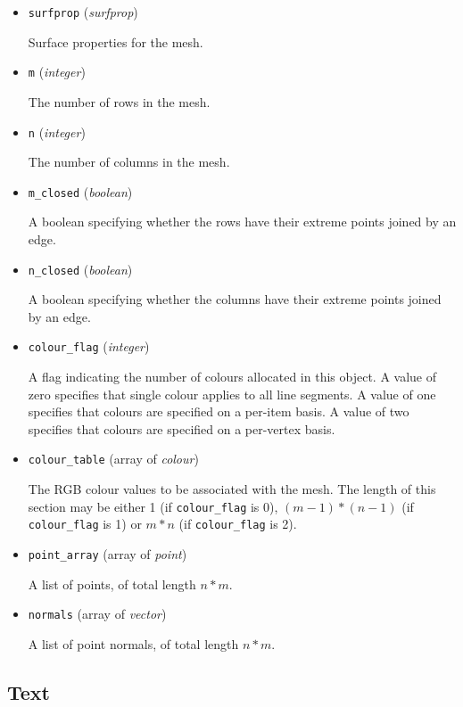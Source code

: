 \documentclass{article}
\newcommand{\kw}[1]{{\tt \mbox{#1}}}
\begin{document}
\begin{itemize}

\item \kw{surfprop} ({\it surfprop})

Surface properties for the mesh.

\item \kw{m} ({\it integer})

The number of rows in the mesh.

\item \kw{n} ({\it integer})

The number of columns in the mesh.

\item \kw{m\_closed} ({\it boolean})

A boolean specifying whether the rows have their extreme points joined
by an edge.

\item \kw{n\_closed} ({\it boolean})

A boolean specifying whether the columns have their extreme points
joined by an edge.

\item \kw{colour\_flag} ({\it integer})

A flag indicating the number of colours allocated in this object.  A
value of zero specifies that single colour applies to all line segments.
A value of one specifies that colours are specified on a per-item basis.
A value of two specifies that colours are specified on a per-vertex basis.

\item \kw{colour\_table} (array of {\it colour})

The RGB colour values to be associated with the mesh.  The
length of this section may be either 1 (if \kw{colour\_flag} is 0), 
$(m - 1) * (n - 1)$ (if \kw{colour\_flag} is 1) or $m * n$ 
(if \kw{colour\_flag} is 2).

\item \kw{point\_array} (array of {\it point})

A list of points, of total length $n * m$.

\item \kw{normals} (array of {\it vector})

A list of point normals, of total length $n * m$.

\end{itemize}

\subsection{Text}
\end{document}
